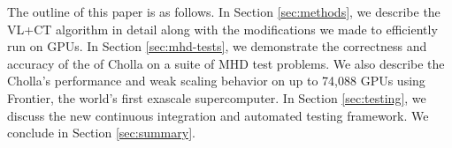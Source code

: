 The outline of this paper is as follows. In Section \ref{sec:methods}, we describe the VL+CT algorithm in detail along with the modifications we made to efficiently run on GPUs. In Section \ref{sec:mhd-tests}, we demonstrate the correctness and accuracy of the of Cholla on a suite of MHD test problems. We also  describe the Cholla's performance and weak scaling behavior on up to 74,088 GPUs using Frontier, the world's first exascale supercomputer. In Section \ref{sec:testing}, we discuss the new continuous integration and automated testing framework. We conclude in Section \ref{sec:summary}. 

